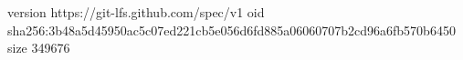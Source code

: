 version https://git-lfs.github.com/spec/v1
oid sha256:3b48a5d45950ac5c07ed221cb5e056d6fd885a06060707b2cd96a6fb570b6450
size 349676

